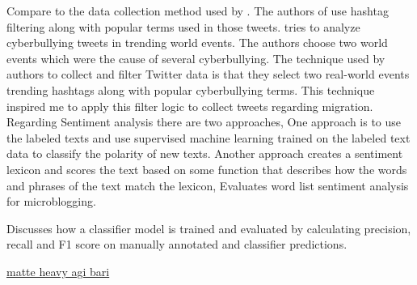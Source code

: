  
Compare to the data collection method used by \cite{Hübl}. The authors of \cite{Cortis} use hashtag filtering
along with popular terms used in those tweets. \cite{Cortis} tries to analyze cyberbullying tweets in trending
world events. The authors choose two world events which were the cause of several cyberbullying.
The technique used by authors to collect and filter Twitter data is that they select two real-world
events trending hashtags along with popular cyberbullying terms. This technique inspired me to
apply this filter logic to collect tweets regarding migration.
Regarding Sentiment analysis there are two approaches, One approach is to use the labeled
texts and use supervised machine learning trained on the labeled text data to classify the polarity
of new texts. Another approach creates a sentiment lexicon and scores the text based on some
function that describes how the words and phrases of the text match the lexicon, \cite{DBLP} Evaluates
word list sentiment analysis for microblogging.

 \cite{Jamie} Discusses how a classifier model is trained
and evaluated by calculating precision, recall and F1 score on manually annotated and classifier
predictions.


 \underline{matte heavy agi bari}
